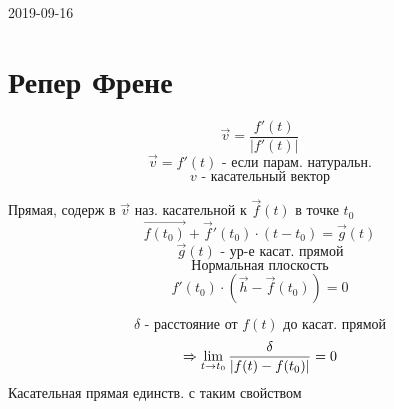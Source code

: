 \documentclass[main, 12pt, fleqn]{subfiles}
\begin{document}
\begin{lect} {2019-09-16}
\section{Репер Френе}
	\begin{Definition}
		\[\vec{v} = \frac{f'(t)}{|f'(t)|}\]
		\[\vec{v} = f'(t) \text{ - если парам. натуральн.}\]
		\[v \text{ - касательный вектор}\]
	\end{Definition}
	
	\begin{Definition}
		Прямая, содерж в $\vec{v}$ наз. касательной к $\vec{f}(t)$ в точке $t_0$
		\[\vec{f(t_0)} + \vec{f}'(t_0) \cdot (t - t_0) = \vec{g}(t)\]
		\[\vec{g}(t) \text{ - ур-е касат. прямой}\]
		\[\text{Нормальная плоскость}\]
		\[f'(t_0) \cdot (\vec{h} - \vec{f}(t_0)) = 0\]
	\end{Definition}

	\begin{Theorem}
		\[\delta \text{ - расстояние от }f(t) \text{ до касат. прямой}\]
		\[\Rightarrow \lim_{t \to t_0} \frac{\delta}{|f(t) - f(t_0)|} = 0 \]
		Касательная прямая единств. с таким свойством
	\end{Theorem}

\end{lect}
\end{document}
